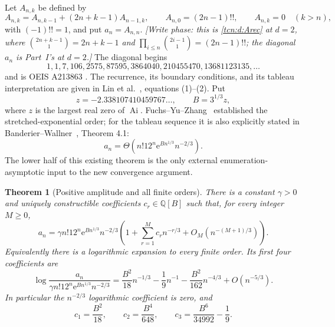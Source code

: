 \documentclass[11pt,letterpaper]{article}
\newcommand{\Ai}{\operatorname{Ai}}
\newcommand{\ee}{\mathrm e}
\newcommand{\Q}{\mathbb Q}
\newtheorem{theorem}{Theorem}[section]
\theoremstyle{remark}
\begin{document}
Let $A_{n,k}$ be defined by
\begin{equation}
 A_{n,k}=A_{n,k-1}+(2n+k-1)A_{n-1,k},\qquad
 A_{n,0}=(2n-1)!!,\qquad A_{n,k}=0\quad(k>n),
 \label{tcn:b:recurrence}
\end{equation}
with $(-1)!!=1$, and put $a_n=A_{n,n}$. \emph{[Write phase: this is \eqref{tcn:d:Arec} at $d=2$, where $\binom{2n+k-1}{1}=2n+k-1$ and $\prod_{i\le n}\binom{2i-1}{1}=(2n-1)!!$; the diagonal $a_n$ is Part~I's at $d=2$.]} The diagonal begins
\[
1,1,7,106,2575,87595,3864040,210455470,13681123135,\ldots
\]
and is OEIS A213863 \cite{OEIS}. The recurrence, its boundary conditions, and its tableau interpretation are given in Lin et al.\ \cite{LL2026}, equations (1)--(2). Put
\[
 z=-2.338107410459767\ldots,\qquad B=3^{1/3}z,
\]
where $z$ is the largest real zero of $\Ai$. Fuchs--Yu--Zhang\ \cite{FYZ2021} established the stretched-exponential order; for the tableau sequence it is also explicitly stated in Banderier--Wallner\ \cite{BW2021}, Theorem 4.1:
\begin{equation}
 a_n=\Theta\!\left(n!12^n\ee^{Bn^{1/3}}n^{-2/3}\right).
 \label{tcn:b:known-theta}
\end{equation}
The lower half of this existing theorem is the only external enumeration-asymptotic input to the new convergence argument.

\begin{theorem}[Positive amplitude and all finite orders]\label{tcn:b:thm:main}
There is a constant $\gamma>0$ and uniquely constructible coefficients $c_r\in\Q[B]$ such that, for every integer $M\ge0$,
\begin{equation}
 a_n=\gamma n!12^n\ee^{Bn^{1/3}}n^{-2/3}
 \left(1+\sum_{r=1}^M c_r n^{-r/3}+O_M(n^{-(M+1)/3})\right).
 \label{tcn:b:forward}
\end{equation}
Equivalently there is a logarithmic expansion to every finite order. Its first four coefficients are
\begin{equation}
 \log\frac{a_n}{\gamma n!12^n\ee^{Bn^{1/3}}n^{-2/3}}
 =\frac{B^2}{18}n^{-1/3}-\frac19n^{-1}
       -\frac{B^2}{162}n^{-4/3}+O(n^{-5/3}).
 \label{tcn:b:logforward}
\end{equation}
In particular the $n^{-2/3}$ logarithmic coefficient is zero, and
\[
 c_1=\frac{B^2}{18},\qquad c_2=\frac{B^4}{648},\qquad
 c_3=\frac{B^6}{34992}-\frac19.
\]
\end{theorem}
\end{document}
